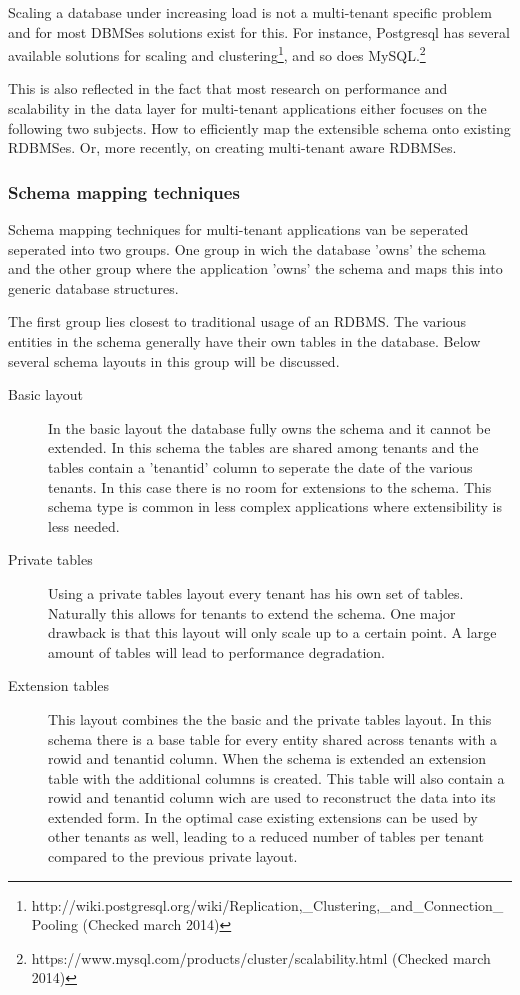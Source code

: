 Scaling a database under increasing load is not a multi-tenant specific problem and for most DBMSes solutions exist for this. 
For instance, Postgresql has several available solutions for scaling and clustering\footnote{http://wiki.postgresql.org/wiki/Replication,\_Clustering,\_and\_Connection\_Pooling (Checked march 2014)}, and so does MySQL.\footnote{https://www.mysql.com/products/cluster/scalability.html (Checked march 2014)}

This is also reflected in the fact that most research on performance and scalability in the data layer for multi-tenant applications either focuses on the following two subjects.
How to efficiently map the extensible schema onto existing RDBMSes.\cite{aulbach2008multi, aulbach2009comparison} 
Or, more recently, on creating multi-tenant aware RDBMSes.\cite{schiller2011native, aulbach2011extensibility} 

\subsubsection{Schema mapping techniques}
Schema mapping techniques for multi-tenant applications van be seperated seperated into two groups. 
One group in wich the database 'owns' the schema  and the other group where the application 'owns' the schema and maps this into generic database structures.\cite{aulbach2009comparison}

The first group lies closest to traditional usage of an RDBMS. 
The various entities in the schema generally have their own tables in the database.
Below several schema layouts in this group will be discussed.
\begin{description}
	\item[Basic layout] In the basic layout the database fully owns the schema and it cannot be extended. 
		In this schema the tables are shared among tenants and the tables contain a 'tenantid' column to seperate the date of the various tenants.
		In this case there is no room for extensions to the schema. 
		This schema type is common in less complex applications where extensibility is less needed. \cite{aulbach2008multi}
	\item[Private tables] Using a private tables layout every tenant has his own set of tables. 
		Naturally this allows for tenants to extend the schema. 
		One major drawback is that this layout will only scale up to a certain point. 
		A large amount of tables will lead to performance degradation.\cite{aulbach2008multi}%
	\item[Extension tables]
		This layout combines the the basic and the private tables layout.
		In this schema there is a base table for every entity shared across tenants with a rowid and tenantid column.
		When the schema is extended an extension table with the additional columns is created.
		This table will also contain a rowid and tenantid column wich are used to reconstruct the data into its extended form.
		In the optimal case existing extensions can be used by other tenants as well, leading to a reduced number of tables per tenant compared to the previous private layout.\cite{aulbach2008multi}
\end{description}

